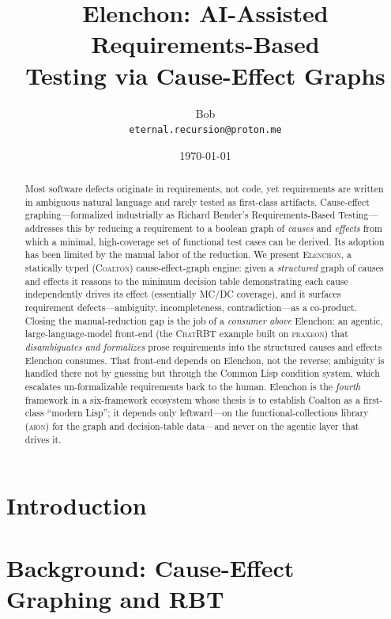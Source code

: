 \documentclass[11pt,a4paper]{article}
\title{\textbf{Elenchon}: AI-Assisted Requirements-Based\\ Testing via Cause-Effect Graphs}
\author{Bob\\ \small\texttt{eternal.recursion@proton.me}}
\date{\today}
\begin{document}
\maketitle

\begin{abstract}
Most software defects originate in requirements, not code, yet requirements are
written in ambiguous natural language and rarely tested as first-class artifacts.
Cause-effect graphing---formalized industrially as Richard Bender's
Requirements-Based Testing---addresses this by reducing a requirement to a boolean
graph of \emph{causes} and \emph{effects} from which a minimal, high-coverage set
of functional test cases can be derived. Its adoption has been limited by the
manual labor of the reduction. We present \textsc{Elenchon}, a statically typed
(\textsc{Coalton}) cause-effect-graph engine: given a \emph{structured} graph of
causes and effects it reasons to the minimum decision table demonstrating each
cause independently drives its effect (essentially MC/DC coverage), and it surfaces
requirement defects---ambiguity, incompleteness, contradiction---as a co-product.
Closing the manual-reduction gap is the job of a \emph{consumer above} Elenchon: an
agentic, large-language-model front-end (the \textsc{ChatRBT} example built on
\textsc{praxeon}) that \emph{disambiguates and formalizes} prose requirements into
the structured causes and effects Elenchon consumes. That front-end depends on
Elenchon, not the reverse; ambiguity is handled there not by guessing but through
the Common Lisp condition system, which escalates un-formalizable requirements back
to the human. Elenchon is the \emph{fourth} framework in a six-framework ecosystem
whose thesis is to establish Coalton as a first-class ``modern Lisp''; it depends
only leftward---on the functional-collections library (\textsc{aion}) for the graph
and decision-table data---and never on the agentic layer that drives it.
\end{abstract}

\section{Introduction}
\label{sec:intro}

\section{Background: Cause-Effect Graphing and RBT}
\label{sec:background}
\end{document}
